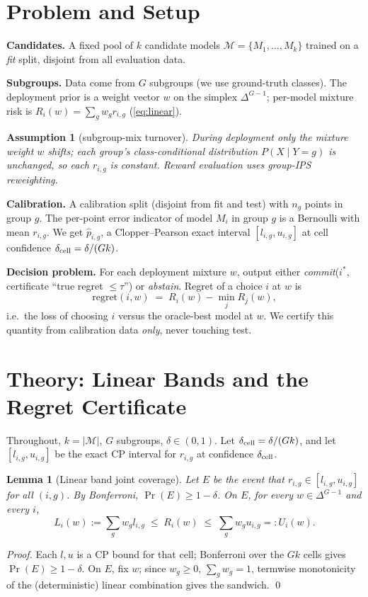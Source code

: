 \documentclass{article}
\newtheorem{lemma}{Lemma}
\newtheorem{assumption}{Assumption}
\begin{document}
\section{Problem and Setup}
\label{sec:setup}

\textbf{Candidates.} A fixed pool of $k$ candidate models $\mathcal{M}=\{M_1,\dots,M_k\}$
trained on a \emph{fit} split, disjoint from all evaluation data.

\textbf{Subgroups.} Data come from $G$ subgroups (we use ground-truth classes). The
deployment prior is a weight vector $w$ on the simplex $\Delta^{G-1}$; per-model mixture
risk is $R_i(w)=\sum_g w_g r_{i,g}$ (\eqref{eq:linear}).

\begin{assumption}[subgroup-mix turnover]
\label{ass:turnover}
During deployment only the mixture weight $w$ shifts; each group's class-conditional
distribution $P(X\mid Y{=}g)$ is unchanged, so each $r_{i,g}$ is constant. Reward
evaluation uses group-IPS reweighting.
\end{assumption}

\textbf{Calibration.} A calibration split (disjoint from fit and test) with $n_g$ points in
group $g$. The per-point error indicator of model $M_i$ in group $g$ is a Bernoulli with
mean $r_{i,g}$. We get $\hat p_{i,g}$, a Clopper--Pearson exact interval
$[l_{i,g},u_{i,g}]$ at cell confidence $\delta_{\rm cell}=\delta/(G k)$.

\textbf{Decision problem.} For each deployment mixture $w$, output either
\emph{commit}($i^*$, certificate ``true regret $\le\tau$'') or \emph{abstain}. Regret of a
choice $i$ at $w$ is
\[
  \mathrm{regret}(i,w) \;=\; R_i(w)-\min_{j} R_j(w),
\]
i.e.\ the loss of choosing $i$ versus the oracle-best model at $w$. We certify this quantity
from calibration data \emph{only}, never touching test.

\section{Theory: Linear Bands and the Regret Certificate}
\label{sec:theory}

Throughout, $k=|\mathcal{M}|$, $G$ subgroups, $\delta\in(0,1)$. Let
$\delta_{\rm cell}=\delta/(G k)$, and let $[l_{i,g},u_{i,g}]$ be the exact CP interval for
$r_{i,g}$ at confidence $\delta_{\rm cell}$.

\begin{lemma}[Linear band joint coverage]
\label{lem:band}
Let $E$ be the event that $r_{i,g}\in[l_{i,g},u_{i,g}]$ for all $(i,g)$. By
Bonferroni, $\Pr(E)\ge 1-\delta$. On $E$, for every $w\in\Delta^{G-1}$ and every $i$,
\[
  L_i(w):=\sum_g w_g l_{i,g}\;\le\; R_i(w)\;\le\;
  \sum_g w_g u_{i,g}=:U_i(w).
\]
\end{lemma}
\begin{proof}
Each $l,u$ is a CP bound for that cell; Bonferroni over the $G k$ cells gives
$\Pr(E)\ge1-\delta$. On $E$, fix $w$; since $w_g\ge0$, $\sum_g w_g=1$, termwise monotonicity
of the (deterministic) linear combination gives the sandwich. \qed
\end{proof}
\end{document}

